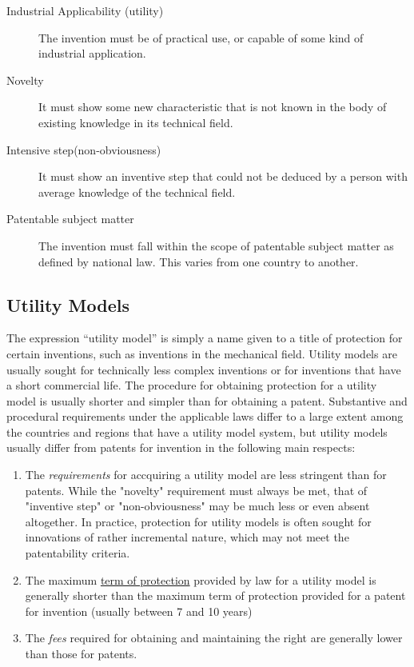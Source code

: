 \documentclass[a4paper,11pt]{article}
\begin{document}
\flushleft
\begin{enumerate}
\begin{description}
\item[Industrial Applicability (utility)] The invention must be of practical
use, or capable of some kind of industrial application.
\item[Novelty] It must show some new characteristic that is not known in the
body of existing knowledge in its technical field.
\item[Intensive step(non-obviousness)] It must show an inventive step that
could not be deduced by a person with average knowledge of the technical field.
\item[Patentable subject matter] The invention must fall within the scope of
patentable subject matter as defined by national law. This varies from one
country to another.
\end{description}
\end{enumerate}

\subsection{Utility Models}
The expression “utility model” is simply a name given to a title of protection
for certain inventions, such as inventions in the mechanical field. Utility models are
usually sought for technically less complex inventions or for inventions that
have a short commercial life. The procedure for obtaining protection for a utility model is usually shorter and simpler than for obtaining a patent. Substantive and
procedural requirements under the applicable laws differ to a large extent
among the countries and regions that have a utility model system, but utility models
usually differ from patents for invention in the following main respects: 

\flushleft
\begin{enumerate}
\item The \emph{requirements} for accquiring a utility model are less stringent
than for patents. While the "novelty" requirement must always be met, that of
"inventive step" or "non-obviousness" may be much less or even absent
altogether. In practice, protection for utility models is often sought for
innovations of rather incremental nature, which may not meet the patentability
criteria.
\item The maximum \underline{term of protection} provided by law for a utility
model is generally shorter than the maximum term of protection provided for a
patent for invention (usually between 7 and 10 years)
\item The \emph{fees} required for obtaining and maintaining the right are
generally lower than those for patents. 
\end{enumerate}
\end{document}
